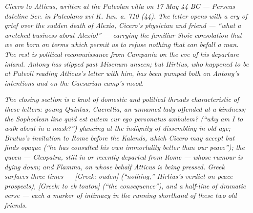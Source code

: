 
\textit{Cicero to Atticus, written at the Puteolan villa on 17
May 44 BC --- Perseus dateline \textit{Scr. in Puteolano xvi K.
Iun. a. 710 (44)}. The letter opens with a cry of grief over
the sudden death of Alexio, Cicero's physician and friend ---
``what a wretched business about Alexio!'' --- carrying the
familiar Stoic consolation that we are born on terms which
permit us to refuse nothing that can befall a man. The rest is
political reconnaissance from Campania on the eve of his
departure inland. Antony has slipped past Misenum unseen; but
Hirtius, who happened to be at Puteoli reading Atticus's
letter with him, has been pumped both on Antony's intentions
and on the Caesarian camp's mood.}

\textit{The closing section is a knot of domestic and political
threads characteristic of these letters: young Quintus,
Caerellia, an unnamed lady offended at a kindness; the
Sophoclean line \textit{quid est autem cur ego personatus
ambulem?} (``why am I to walk about in a mask?'') glancing at
the indignity of dissembling in old age; Brutus's invitation to
Rome before the Kalends, which Cicero may accept but finds
opaque (``he has consulted his own immortality better than our
peace''); the queen --- Cleopatra, still in or recently
departed from Rome --- whose rumour is dying down; and Flamma,
on whose behalf Atticus is being pressed. Greek surfaces three
times --- \textit{[Greek: ouden]} (``nothing,'' Hirtius's
verdict on peace prospects), \textit{[Greek: to ek toutou]}
(``the consequence''), and a half-line of dramatic
verse --- each a marker of intimacy in the running shorthand
of these two old friends.}

